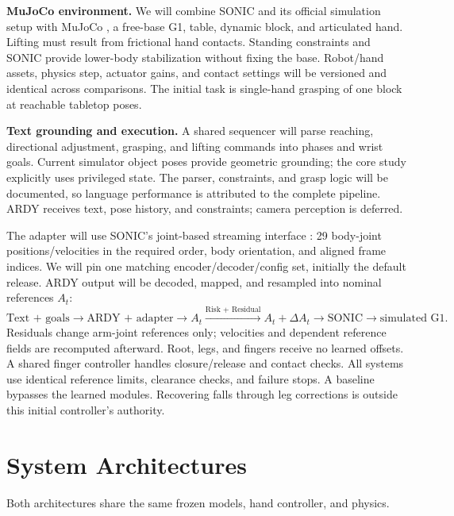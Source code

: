 \documentclass[11pt,a4paper]{article}
\begin{document}
\textbf{MuJoCo environment.}
We will combine SONIC \cite{sonic} and its official simulation setup
\cite{soniccode} with MuJoCo \cite{mujoco}, a free-base G1, table, dynamic block,
and articulated hand. Lifting must result from frictional hand contacts.
Standing constraints and SONIC provide lower-body stabilization without fixing
the base. Robot/hand assets, physics step, actuator gains, and contact settings
will be versioned and identical across comparisons. The initial task is
single-hand grasping of one block at reachable tabletop poses.

\textbf{Text grounding and execution.}
A shared sequencer will parse reaching, directional adjustment, grasping, and
lifting commands into phases and wrist goals. Current simulator object poses
provide geometric grounding; the core study explicitly uses privileged state.
The parser, constraints, and grasp logic will be documented, so language
performance is attributed to the complete pipeline. ARDY receives text,
pose history, and constraints; camera perception is deferred.

The adapter will use SONIC's joint-based streaming interface \cite{sonicstream}:
29 body-joint positions/velocities in the required order, body orientation,
and aligned frame indices. We will pin one matching encoder/decoder/config
set, initially the default release. ARDY output will be decoded, mapped, and
resampled into nominal references $A_t$:
\[
\text{Text + goals}\rightarrow\text{ARDY + adapter}\rightarrow A_t
\xrightarrow{\text{Risk + Residual}} A_t+\Delta A_t
\rightarrow\text{SONIC}\rightarrow\text{simulated G1}.
\]
Residuals change arm-joint references only; velocities and dependent reference
fields are recomputed afterward. Root, legs, and fingers receive no learned
offsets. A shared finger controller handles closure/release and contact checks.
All systems use identical reference limits, clearance checks, and failure stops.
A baseline bypasses the learned modules. Recovering falls through leg
corrections is outside this initial controller's authority.

\newpage
\section{System Architectures}
Both architectures share the same frozen models, hand controller, and physics.
\end{document}
